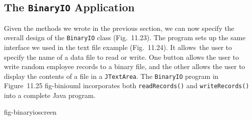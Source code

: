 \subsection{The {\tt BinaryIO} Application}
\noindent Given the methods we wrote in the previous section, we can now
specify the overall design of the {\tt BinaryIO} class
(Fig.~11.23).  The program sets up the same interface we used
in the text file example (Fig.~11.24). It allows~the 
user to specify the name of a data file to read or
write.  One button allows the user to write random employee records to a binary
file, and the other allows the user to display the contents of a file
in a {\tt JTextArea}. The {\tt BinaryIO} program in Figure~11.25
{fig-biniouml}
incorporates both {\tt readRecords()} and {\tt writeRecords()} into a
complete Java program. 

 {fig-binaryioscreen}

